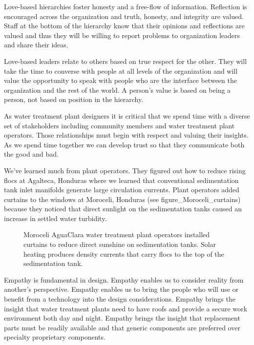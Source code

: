 \documentclass[letterpaper,10pt,english]{sphinxmanual}
\let\sphinxpxdimen\pdfpxdimen\else\newdimen\sphinxpxdimen
\begin{document}
Love-based hierarchies foster honesty and a free-flow of information. Reflection is encouraged across the organization and truth, honesty, and integrity are valued. Staff at the bottom of the hierarchy know that their opinions and reflections are valued and thus they will be willing to report problems to organization leaders and share their ideas.

Love-based leaders relate to others based on true respect for the other. They will take the time to converse with people at all levels of the organization and will value the opportunity to speak with people who are the interface between the organization and the rest of the world. A person’s value is based on being a person, not based on position in the hierarchy.

As water treatment plant designers it is critical that we spend time with a diverse set of stakeholders including community members and water treatment plant operators. Those relationships must begin with respect and valuing their insights. As we spend time together we can develop trust so that they communicate both the good and bad.

We’ve learned much from plant operators. They figured out how to reduce rising flocs at Agalteca, Honduras where we learned that conventional sedimentation tank inlet manifolds generate large circulation currents. Plant operators added curtains to the windows at Moroceli, Honduras (see figure\_Moroceli\_curtains) because they noticed that direct sunlight on the sedimentation tanks caused an increase in settled water turbidity.

\begin{figure}[htbp]
\centering
\capstart

\noindent\sphinxincludegraphics[width=500\sphinxpxdimen]{{Moroceli_curtains}.jpg}
\caption{Moroceli AguaClara water treatment plant operators installed curtains to reduce direct sunshine on sedimentation tanks. Solar heating produces density currents that carry flocs to the top of the sedimentation tank.}\label{\detokenize{Introduction/Introduction:id13}}\label{\detokenize{Introduction/Introduction:figure-moroceli-curtains}}\end{figure}

Empathy is fundamental in design. Empathy enables us to consider reality from another’s perspective. Empathy enables us to bring the people who will use or benefit from a technology into the design considerations. Empathy brings the insight that water treatment plants need to have roofs and provide a secure work environment both day and night. Empathy brings the insight that replacement parts must be readily available and that generic components are preferred over specialty proprietary components.
\end{document}
